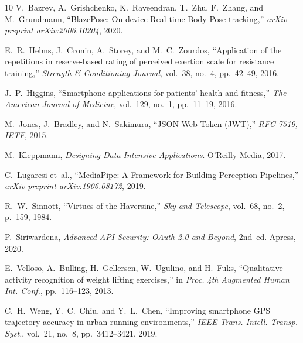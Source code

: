 \documentclass[12pt,a4paper]{report}
\begin{document}
\clearpage
{}
\begin{thebibliography}{10}
V.~Bazrev, A.~Grishchenko, K.~Raveendran, T.~Zhu, F.~Zhang, and M.~Grundmann, ``BlazePose: On-device Real-time Body Pose tracking,'' \emph{arXiv preprint arXiv:2006.10204}, 2020.

E.~R.~Helms, J.~Cronin, A.~Storey, and M.~C.~Zourdos, ``Application of the repetitions in reserve-based rating of perceived exertion scale for resistance training,'' \emph{Strength \& Conditioning Journal}, vol.~38, no.~4, pp.~42--49, 2016.

J.~P.~Higgins, ``Smartphone applications for patients' health and fitness,'' \emph{The American Journal of Medicine}, vol.~129, no.~1, pp.~11--19, 2016.

M.~Jones, J.~Bradley, and N.~Sakimura, ``JSON Web Token (JWT),'' \emph{RFC 7519, IETF}, 2015.

M.~Kleppmann, \emph{Designing Data-Intensive Applications}. O'Reilly Media, 2017.

C.~Lugaresi et~al., ``MediaPipe: A Framework for Building Perception Pipelines,'' \emph{arXiv preprint arXiv:1906.08172}, 2019.

R.~W.~Sinnott, ``Virtues of the Haversine,'' \emph{Sky and Telescope}, vol.~68, no.~2, p.~159, 1984.

P.~Siriwardena, \emph{Advanced API Security: OAuth 2.0 and Beyond}, 2nd~ed. Apress, 2020.

E.~Velloso, A.~Bulling, H.~Gellersen, W.~Ugulino, and H.~Fuks, ``Qualitative activity recognition of weight lifting exercises,'' in \emph{Proc. 4th Augmented Human Int. Conf.}, pp.~116--123, 2013.

C.~H.~Weng, Y.~C.~Chiu, and Y.~L.~Chen, ``Improving smartphone GPS trajectory accuracy in urban running environments,'' \emph{IEEE Trans. Intell. Transp. Syst.}, vol.~21, no.~8, pp.~3412--3421, 2019.
\end{thebibliography}
\end{document}

